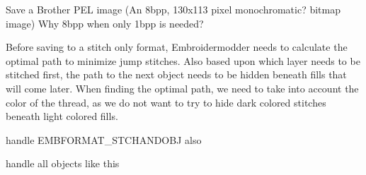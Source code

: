 \begin{DoxyRefList}
\label{todo__todo000014}%
%
Save a Brother PEL image (An 8bpp, 130x113 pixel monochromatic? bitmap image) Why 8bpp when only 1bpp is needed? 
\item[Member \mbox{\hyperlink{imgui__main_8c_ab7315b158db533fb73b44c2cbfe3c394}{save\+\_\+save}} (const char $\ast$file\+Name)]\label{todo__todo000209}%
%
Before saving to a stitch only format, Embroidermodder needs to calculate the optimal path to minimize jump stitches. Also based upon which layer needs to be stitched first, the path to the next object needs to be hidden beneath fills that will come later. When finding the optimal path, we need to take into account the color of the thread, as we do not want to try to hide dark colored stitches beneath light colored fills.

\label{todo__todo000210}%
%
handle EMBFORMAT\+\_\+\+STCHANDOBJ also 

\label{todo__todo000211}%
%
handle all objects like this 


\end{DoxyRefList}
